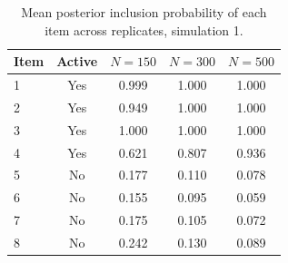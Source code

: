\begin{table}[H]
\centering
\begin{tabular}{lcccc}
  \toprule
Item & Active & $N = 150$ & $N = 300$ & $N = 500$ \\ 
  \midrule
1 & Yes & 0.999 & 1.000 & 1.000 \\ 
  2 & Yes & 0.949 & 1.000 & 1.000 \\ 
  3 & Yes & 1.000 & 1.000 & 1.000 \\ 
  4 & Yes & 0.621 & 0.807 & 0.936 \\ 
  5 & No & 0.177 & 0.110 & 0.078 \\ 
  6 & No & 0.155 & 0.095 & 0.059 \\ 
  7 & No & 0.175 & 0.105 & 0.072 \\ 
  8 & No & 0.242 & 0.130 & 0.089 \\ 
   \bottomrule
\end{tabular}
\caption{Mean posterior inclusion probability of each item across replicates, simulation 1.} 
\label{table:sim1_item_pip}
\end{table}

